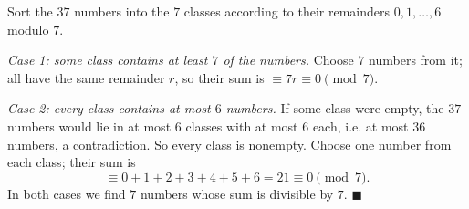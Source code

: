 Sort the \(37\) numbers into the \(7\) classes according to their remainders \(0,1,\dots,6\) modulo \(7\).

\emph{Case 1: some class contains at least \(7\) of the numbers.} Choose \(7\) numbers from it; all have the same remainder \(r\), so their sum is \(\equiv7r\equiv0\pmod 7\).

\emph{Case 2: every class contains at most \(6\) numbers.} If some class were empty, the \(37\) numbers would lie in at most \(6\) classes with at most \(6\) each, i.e. at most \(36\) numbers, a contradiction. So every class is nonempty. Choose one number from each class; their sum is
\[
\equiv0+1+2+3+4+5+6=21\equiv0\pmod 7 .
\]
In both cases we find \(7\) numbers whose sum is divisible by \(7\). \(\blacksquare\)
